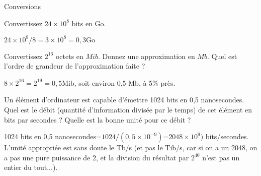 \begin{exercice}
  \begin{exercicelet}{Conversions}
    \begin{questions}
    \item Convertissez $24\times 10^8$ bits en $\mathrm{Go}$.
      \begin{correction} $24\times 10^8/8=3\times 10^8=0,3 \mathrm{Go}$
      \end{correction}
    \item Convertissez $2^{16}$ octets en $Mib$. Donnez une approximation en
      $Mb$. Quel est l'ordre de grandeur de l'approximation faite ?
      \begin{correction} $8\times2^{16}=2^{19}=0,5 \mathrm{Mib}$, soit
        environ 0,5 Mb, à 5\% près.
      \end{correction}
    \item Un élément d'ordinateur est capable d'émettre 1024 bits en 0,5
      nanosecondes. Quel est le débit (quantité d'information divisée par le
      temps) de cet élément en bits par secondes ? Quelle est la bonne unité
      pour ce débit ?
      \begin{correction} 1024 bits en 0,5
        nanosecondes=$1024/(0,5\times10^{-9})$=$2048\times10^{9})$
        bits/secondes. L'unité appropriée est sans doute le Tb/s (et pas le
        Tib/s, car si on a un 2048, on a pas une pure puissance de 2, et la
        division du résultat par $2^{40}$ n'est pas un entier du tout...).
      \end{correction}
    \end{questions}
  \end{exercicelet}
\end{exercice}
